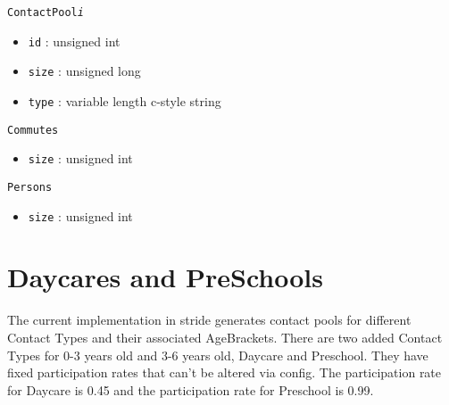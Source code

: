 \texttt{ContactPool\textit{i}}
\begin{itemize}
\item \texttt{id} : unsigned int 
\item \texttt{size} : unsigned long 
\item \texttt{type} : variable length c-style string
\end{itemize}

\texttt{Commutes}
\begin{itemize}
\item \texttt{size} : unsigned int
\end{itemize}

\texttt{Persons}
\begin{itemize}
\item \texttt{size} : unsigned int
\end{itemize}

\section{Daycares and PreSchools}
\label{section:Dataycares and PreSchools}
The current implementation in stride generates contact pools for different Contact Types and their associated AgeBrackets. There are two added Contact Types for 0-3 years old and 3-6 years old, Daycare and Preschool. They have fixed participation rates that can't be altered via config. The participation rate for Daycare is 0.45 and the participation rate for Preschool is 0.99.